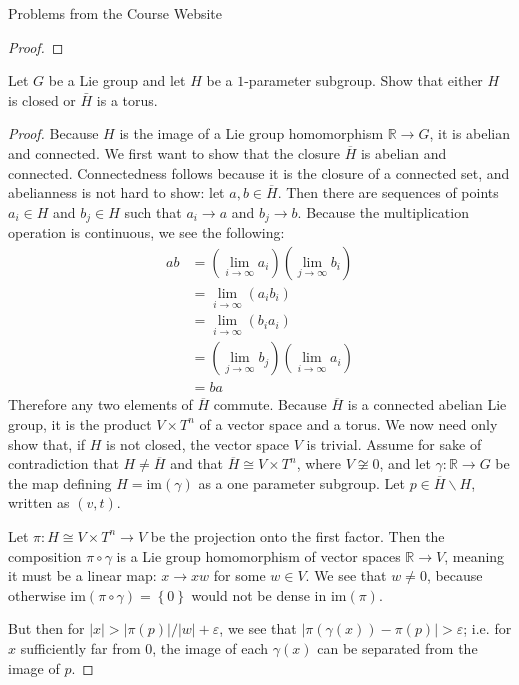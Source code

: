 \documentclass[12pt]{article}
\newcommand{\R}{\mathbb{R}}
\theoremstyle{definition}
\newenvironment{problem}[2][Problem]{\begin{trivlist}
\item[\hskip \labelsep {\bfseries #1}\hskip \labelsep {\bfseries #2.}]}{\end{trivlist}}
\begin{document}
\begin{section}{Problems from the Course Website}
\begin{problem}{6}
\begin{proof}
		\end{proof}
	\end{problem}
	\begin{problem}{7}
		Let $G$ be a Lie group and let $H$ be a $1$-parameter subgroup. Show that either $H$ is closed or $\bar H$ is a torus.
		\begin{proof}
			Because $H$ is the image of a Lie group homomorphism $\R \to G$, it is abelian and connected. We first want to show that the closure $\overline H$ is abelian and connected. Connectedness follows because it is the closure of a connected set, and abelianness is not hard to show: let $a, b \in \overline H$. Then there are sequences of points $a_i \in H$ and $b_j \in H$ such that $a_i \to a$ and $b_j \to b$. Because the multiplication operation is continuous, we see the following:
			\begin{align*}
				ab &= (\lim_{i \to \infty} a_i) (\lim_{j \to \infty}b_i)\\
				&= \lim_{i \to \infty} (a_i b_i)\\
				&= \lim_{i \to \infty} (b_i a_i)\\
				&= (\lim_{j \to \infty} b_j) (\lim_{i \to \infty} a_i)\\
				&= ba
			\end{align*}
			Therefore any two elements of $\overline H$ commute. Because $\overline H$ is a connected abelian Lie group, it is the product $V \times T^n$ of a vector space and a torus. We now need only show that, if $H$ is not closed, the vector space $V$ is trivial.
			Assume for sake of contradiction that $H \neq \overline H$ and that $\overline H \cong V \times T^n$, where $V \not\cong 0$, and let $\gamma : \R \to G$ be the map defining $H = \text{im}(\gamma)$ as a one parameter subgroup. Let $p \in \overline H \backslash H$, written as $(v, t)$. 
			\par Let $\pi : H \cong V \times T^n \to V$ be the projection onto the first factor. Then the composition $\pi \circ \gamma$ is a Lie group homomorphism of vector spaces $\R \to V$, meaning it must be a linear map: $x \to x w$ for some $w \in V$. We see that $w \neq 0$, because otherwise $\text{im}(\pi \circ \gamma) = \left\{ 0 \right\}$ would not be dense in $\text{im}(\pi)$.
			\par But then for $\left \lvert {  x } \right \lvert > \left \lvert { \pi(p) } \right \lvert /\left \lvert { w } \right \lvert  + \varepsilon$, we see that $\lvert \pi(\gamma(x)) - \pi(p) \rvert > \varepsilon$; i.e. for $x$ sufficiently far from $0$, the image of each $\gamma(x)$ can be separated from the image of $p$. 

\end{proof}
\end{problem}
\end{section}
\end{document}
